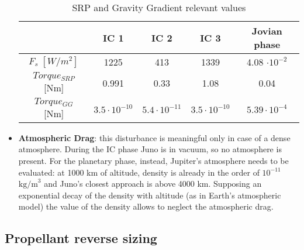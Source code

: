 \begin{itemize}
    \begin{table}[H]
        \renewcommand{\arraystretch}{1.3}
        \centering
        \small
        \begin{tabular}{|c|c|c|c|c|}
            \hline
            &\textbf{IC 1} & \textbf{IC 2} & \textbf{IC 3} & \textbf{Jovian phase} \\
            \hline
            \hline
            $F_{s} \; [W/m^2]$ & 1225 & 413 & 1339 & 4.08 $\cdot 10^{-2}$ \\
            \hline
            $Torque_{SRP}$ [Nm] & 0.991 & 0.33 & 1.08 & 0.04 \\
            \hline
             $Torque_{GG}$ [Nm] & $3.5 \cdot 10^{-10}$ & $5.4 \cdot 10^{-11}$ & $3.5 \cdot 10^{-10}$ & $5.39 \cdot 10^{-4}$ \\
            \hline
        \end{tabular}
        \caption{SRP and Gravity Gradient relevant values}
        \label{table:SRP_GGG}
    \end{table}
    \vspace*{-4mm}
    
    \item \textbf{Atmospheric Drag}: this disturbance is meaningful only in case of a dense atmosphere. During the IC phase Juno is in vacuum, so no atmosphere is present. For the planetary phase, instead, Jupiter's atmosphere needs to be evaluated: at 1000 km of altitude, density is already in the order of $10^{-11}$ $\textrm{kg/m}^3$ and Juno's closest approach is above 4000 km. Supposing an exponential decay of the density with altitude (as in Earth's atmospheric model) the value of the density allows to neglect the atmospheric drag\cite{jupiter_density}.
    
        
\end{itemize}

\subsection{Propellant reverse sizing}
\label{subsec:prop_rev_sizing}

